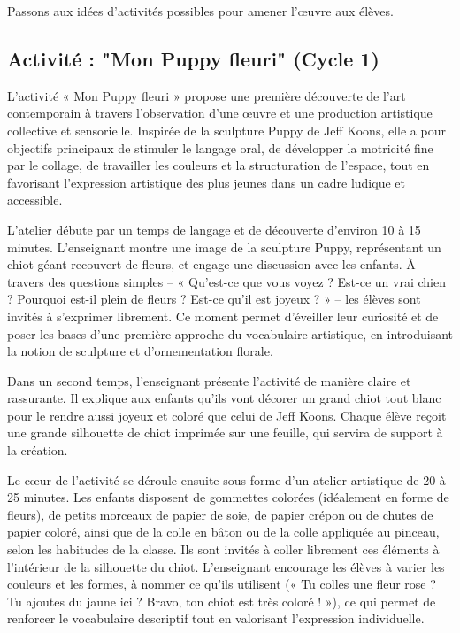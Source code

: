 \documentclass[12pt]{article}
\begin{document}
Passons aux idées d’activités possibles pour amener l’œuvre aux élèves.

\subsection*{Activité : "Mon Puppy fleuri" (Cycle 1)}

L’activité « Mon Puppy fleuri » propose une première découverte de l’art contemporain à travers l’observation d’une œuvre et une production artistique collective et sensorielle. Inspirée de la sculpture Puppy de Jeff Koons, elle a pour objectifs principaux de stimuler le langage oral, de développer la motricité fine par le collage, de travailler les couleurs et la structuration de l’espace, tout en favorisant l’expression artistique des plus jeunes dans un cadre ludique et accessible.

L’atelier débute par un temps de langage et de découverte d’environ 10 à 15 minutes. L’enseignant montre une image de la sculpture Puppy, représentant un chiot géant recouvert de fleurs, et engage une discussion avec les enfants. À travers des questions simples – « Qu’est-ce que vous voyez ? Est-ce un vrai chien ? Pourquoi est-il plein de fleurs ? Est-ce qu’il est joyeux ? » – les élèves sont invités à s’exprimer librement. Ce moment permet d’éveiller leur curiosité et de poser les bases d’une première approche du vocabulaire artistique, en introduisant la notion de sculpture et d’ornementation florale.

Dans un second temps, l’enseignant présente l’activité de manière claire et rassurante. Il explique aux enfants qu’ils vont décorer un grand chiot tout blanc pour le rendre aussi joyeux et coloré que celui de Jeff Koons. Chaque élève reçoit une grande silhouette de chiot imprimée sur une feuille, qui servira de support à la création.

Le cœur de l’activité se déroule ensuite sous forme d’un atelier artistique de 20 à 25 minutes. Les enfants disposent de gommettes colorées (idéalement en forme de fleurs), de petits morceaux de papier de soie, de papier crépon ou de chutes de papier coloré, ainsi que de la colle en bâton ou de la colle appliquée au pinceau, selon les habitudes de la classe. Ils sont invités à coller librement ces éléments à l’intérieur de la silhouette du chiot. L’enseignant encourage les élèves à varier les couleurs et les formes, à nommer ce qu’ils utilisent (« Tu colles une fleur rose ? Tu ajoutes du jaune ici ? Bravo, ton chiot est très coloré ! »), ce qui permet de renforcer le vocabulaire descriptif tout en valorisant l’expression individuelle.
\end{document}
